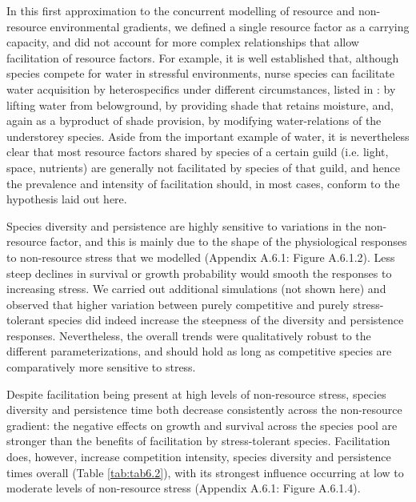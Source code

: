 In this first approximation to the concurrent modelling of resource and non-resource environmental gradients, we defined a single resource factor as a carrying capacity, and did not account for more complex relationships that allow facilitation of resource factors. For example, it is well established that, although species compete for water in stressful environments, nurse species can facilitate water acquisition by heterospecifics under different circumstances, listed in \cite{Maestre2009}: by lifting water from belowground, by providing shade that retains moisture, and, again as a byproduct of shade provision, by modifying water-relations of the understorey species. Aside from the important example of water, it is nevertheless clear that most resource factors shared by species of a certain guild (i.e. light, space, nutrients) are generally not facilitated by species of that guild, and hence the prevalence and intensity of facilitation should, in most cases, conform to the hypothesis laid out here.

Species diversity and persistence are highly sensitive to variations in the non-resource factor, and this is mainly due to the shape of the physiological responses to non-resource stress that we modelled (Appendix A.6.1: Figure A.6.1.2). Less steep declines in survival or growth probability would smooth the responses to increasing stress. We carried out additional simulations (not shown here) and observed that higher variation between purely competitive and purely stress-tolerant species did indeed increase the steepness of the diversity and persistence responses. Nevertheless, the overall trends were qualitatively robust to the different parameterizations, and should hold as long as competitive species are comparatively more sensitive to stress.

Despite facilitation being present at high levels of non-resource stress, species diversity and persistence time both decrease consistently across the non-resource gradient: the negative effects on growth and survival across the species pool are stronger than the benefits of facilitation by stress-tolerant species. Facilitation does, however, increase competition intensity, species diversity and persistence times overall (Table \ref{tab:tab6.2}), with its strongest influence occurring at low to moderate levels of non-resource stress (Appendix A.6.1: Figure A.6.1.4).

